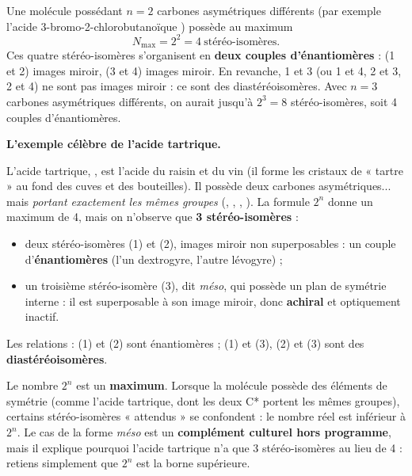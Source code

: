 \documentclass[11pt]{article}
\newcommand{\cle}[1]{{\popxbold\color{popdark}#1}}
\begin{document}
\begin{exemplebox}
Une molécule possédant $n = 2$ carbones asymétriques différents (par exemple l'acide 3-bromo-2-chlorobutanoïque ) possède au maximum
\[ N_{\max} = 2^{2} = 4 \ \text{stéréo-isomères}. \]
Ces quatre stéréo-isomères s'organisent en \textbf{deux couples d'énantiomères} : (1 et 2) images miroir, (3 et 4) images miroir. En revanche, 1 et 3 (ou 1 et 4, 2 et 3, 2 et 4) ne sont pas images miroir : ce sont des \cle{diastéréoisomères}. Avec $n = 3$ carbones asymétriques différents, on aurait jusqu'à $2^{3} = 8$ stéréo-isomères, soit 4 couples d'énantiomères.
\end{exemplebox}

\textbf{L'exemple célèbre de l'acide tartrique.}\par
L'acide tartrique, , est l'acide du raisin et du vin (il forme les cristaux de « tartre » au fond des cuves et des bouteilles). Il possède deux carbones asymétriques... mais \emph{portant exactement les mêmes groupes} (, , , ). La formule $2^{n}$ donne un maximum de 4, mais on n'observe que \textbf{3 stéréo-isomères} :
\begin{itemize}
\item deux stéréo-isomères (1) et (2), images miroir non superposables : un couple d'\textbf{énantiomères} (l'un dextrogyre, l'autre lévogyre) ;
\item un troisième stéréo-isomère (3), dit \emph{méso}, qui possède un plan de symétrie interne : il est superposable à son image miroir, donc \textbf{achiral} et optiquement inactif.
\end{itemize}
Les relations : (1) et (2) sont énantiomères ; (1) et (3), (2) et (3) sont des \textbf{diastéréoisomères}.

\begin{attention}
Le nombre $2^{n}$ est un \textbf{maximum}. Lorsque la molécule possède des éléments de symétrie (comme l'acide tartrique, dont les deux C* portent les mêmes groupes), certains stéréo-isomères « attendus » se confondent : le nombre réel est inférieur à $2^{n}$. Le cas de la forme \emph{méso} est un \textbf{complément culturel hors programme}, mais il explique pourquoi l'acide tartrique n'a que 3 stéréo-isomères au lieu de 4 : retiens simplement que $2^{n}$ est la borne supérieure.
\end{attention}
\end{document}
